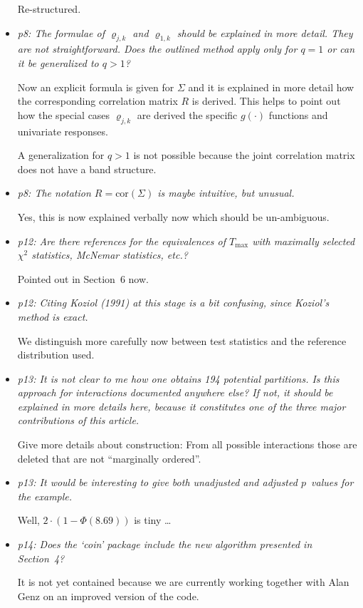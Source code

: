 \documentclass[11pt,a4paper]{article}
\begin{document}
\begin{itemize}
	Re-structured.
	
  \item \textit{p8: The formulae of $\varrho_{j,k}$ and $\varrho_{1,k}$ should be
        explained in more detail. They are not straightforward. Does the outlined
	method apply only for $q = 1$ or can it be generalized to $q > 1$?}
	
	Now an explicit formula is given for $\Sigma$ and it is explained in more
	detail how the corresponding correlation matrix $R$ is derived. This
	helps to point out how the special cases $\varrho_{j, k}$ are
	derived the specific $g(\cdot)$ functions and univariate responses.
	
	A generalization for $q > 1$ is not possible because the joint correlation
	matrix does not have a band structure.
	
  \item \textit{p8: The notation $R = \mbox{cor}(\Sigma)$ is maybe intuitive, but unusual.}
  
        Yes, this is now explained verbally now which should be un-ambiguous.
	
  \item \textit{p12: Are there references for the equivalences of $T_{\max}$ with maximally
        selected $\chi^2$ statistics, McNemar statistics, etc.?}
	
	Pointed out in Section~6 now.
	
  \item \textit{p12: Citing Koziol (1991) at this stage is a bit confusing, since
        Koziol's method is exact.}
	
	We distinguish more carefully now between test statistics and the reference
	distribution used.
	
  \item \textit{p13: It is not clear to me how one obtains 194 potential partitions.
        Is this approach for interactions documented anywhere else? If not, it should be
        explained in more details here, because it constitutes one of the three major
        contributions of this article.}
	
	Give more details about construction: From all possible interactions those are
	deleted that are not ``marginally ordered''.
	
  \item \textit{p13: It would be interesting to give both unadjusted and adjusted $p$~values
        for the example.}
	
	Well, $2 \cdot (1 - \Phi(8.69))$ is tiny \dots
	
  \item \textit{p14: Does the `coin' package include the new algorithm presented in
        Section~4?}
	
	It is not yet contained because we are currently working together with Alan Genz
	on an improved version of the code.
    
\end{itemize}
\end{document}
